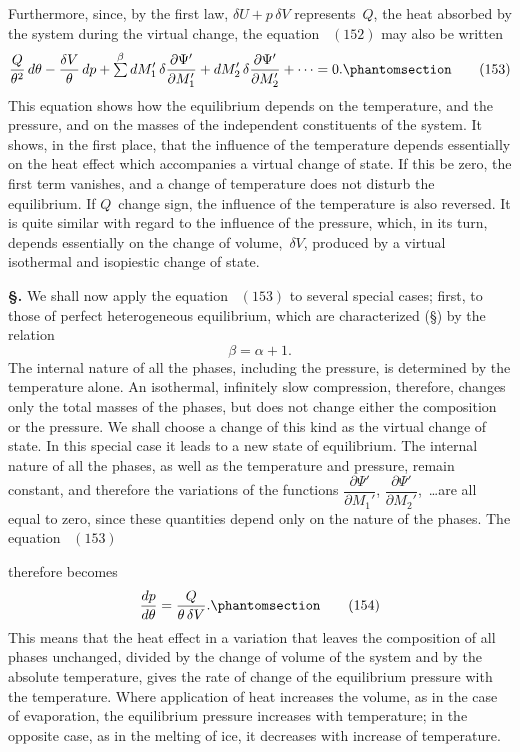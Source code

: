 \documentclass[12pt]{book}[2005/09/16]
\newcommand{\Typo}[2]{#2}
\newcommand{\Erratum}[2]{#2}
\newcommand{\Section}[1]{
  \medskip\par\textbf{§\;#1}
  \label{section:#1}
}
\newcommand{\SecRef}[2][§\;]{\hyperref[section:#2.]{{\upshape #1#2}}}
\newcommand{\Tag}[1]{%
  \phantomsection\label{eqn:#1}\tag*{\ensuremath{#1}}%
}
\newcommand{\Eq}[1]{%
  \hyperref[eqn:#1]{\ensuremath{#1}}%
}
\newcommand{\PageSep}[1]{\ignorespaces}
\newcommand{\dd}{\partial}
\newcommand{\tsum}{\mathop{\textstyle\sum}\limits}
\begin{document}
Furthermore, since, by the first law, $\delta U + p\, \delta V$ represents~$Q$,
the heat absorbed by the system during the virtual
change, the equation~\Eq{(152)} may also be written
\[
\frac{Q}{\Typo{\theta_{2}}{\theta^{2}}}\, d\theta - \frac{\delta V}{\theta}\, dp
  + \tsum^{\beta} dM_{1}'\, \delta \frac{\dd \Psi'}{\dd M_{1}'} + \Erratum{dM_{2}\, \delta \frac{\dd \Psi''}{\dd M_{2}'}}{dM_{2}'\, \delta \frac{\dd \Psi'}{\dd M_{2}'}} + \dots = 0.
\Tag{(153)}
\]
This equation shows how the equilibrium depends on the
temperature, and the pressure, and on the masses of the
independent constituents of the system. It shows, in
the first place, that the influence of the temperature
depends essentially on the heat effect which accompanies
a virtual change of state. If this be zero, the first term
vanishes, and a change of temperature does not disturb
the equilibrium. If $Q$~change sign, the influence of the
temperature is also reversed. It is quite similar with regard
to the influence of the pressure, which, in its turn, depends
essentially on the change of volume,~$\delta V$, produced by a
virtual isothermal and isopiestic change of state.

\Section{212.} We shall now apply the equation~\Eq{(153)} to several
special cases; first, to those of perfect heterogeneous equilibrium,
which are characterized (\SecRef{206}) by the relation
\[
\beta = \alpha + 1.
\]
The internal nature of all the phases, including the pressure,
is determined by the temperature alone. An isothermal,
infinitely slow compression, therefore, changes only the total
masses of the phases, but does not change either the composition
or the pressure. We shall choose a change of this
kind as the virtual change of state. In this special case it
leads to a new state of equilibrium. The internal nature of
all the phases, as well as the temperature and pressure,
\PageSep{187}
remain constant, and therefore the variations of the functions
$\dfrac{\dd \Psi'}{\dd M_{1}'}$, $\dfrac{\dd \Psi'}{\dd M_{2}'}$,~\dots are all equal to zero, since these quantities
depend only on the nature of the phases. The equation~\Eq{(153)}
therefore becomes
\[
\frac{dp}{d\theta} = \frac{Q}{\theta\, \delta V}.
\Tag{(154)}
\]
This means that the heat effect in a variation that leaves
the composition of all phases unchanged, divided by the
change of volume of the system and by the absolute temperature,
gives the rate of change of the equilibrium pressure
with the temperature. Where application of heat increases
the volume, as in the case of evaporation, the equilibrium
pressure increases with temperature; in the opposite case,
as in the melting of ice, it decreases with increase of
temperature.
\end{document}
